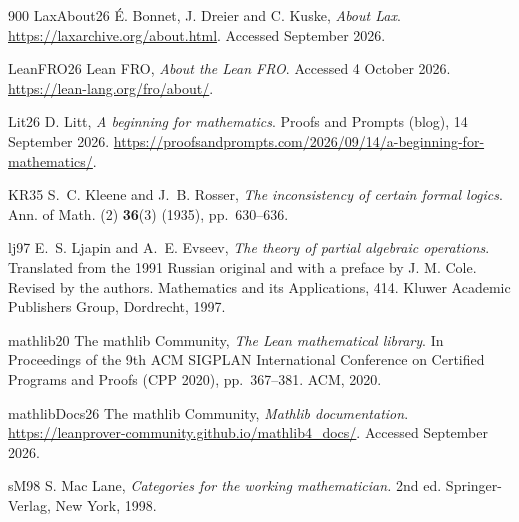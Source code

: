 \begin{thebibliography}{900}
\bibitem%
{LaxAbout26} \'{E}. Bonnet, J. Dreier and C. Kuske, \emph{About Lax}. \url{https://laxarchive.org/about.html}. Accessed September 2026.

\bibitem%
{LeanFRO26} Lean FRO, \emph{About the Lean FRO}. Accessed 4 October 2026. \url{https://lean-lang.org/fro/about/}.

\bibitem%
{Lit26} D. Litt, \emph{A beginning for mathematics}. Proofs and Prompts (blog), 14 September 2026. \url{https://proofsandprompts.com/2026/09/14/a-beginning-for-mathematics/}.

\bibitem%
{KR35} S.~C. Kleene and J.~B. Rosser, \emph{The inconsistency of certain formal logics}. Ann. of Math. (2) \textbf{36}(3) (1935), pp.~630--636.

\bibitem%
{lj97} E.~S. Ljapin and A.~E. Evseev,
\emph{The theory of partial algebraic operations}. Translated from the 1991 Russian original and with a preface by J. M. Cole. Revised by the authors. Mathematics and its Applications, 414. Kluwer Academic Publishers Group, Dordrecht, 1997. 

\bibitem%
{mathlib20} The mathlib Community, \emph{The Lean mathematical library}. In Proceedings of the 9th ACM SIGPLAN International Conference on Certified Programs and Proofs (CPP 2020), pp.~367--381. ACM, 2020.

\bibitem%
{mathlibDocs26} The mathlib Community, \emph{Mathlib documentation}. \url{https://leanprover-community.github.io/mathlib4_docs/}. Accessed September 2026.


\bibitem%
{sM98} S. Mac Lane, \emph{Categories for the working mathematician.} 2nd ed. Springer-Verlag, New York, 1998.



%


\end{thebibliography}
